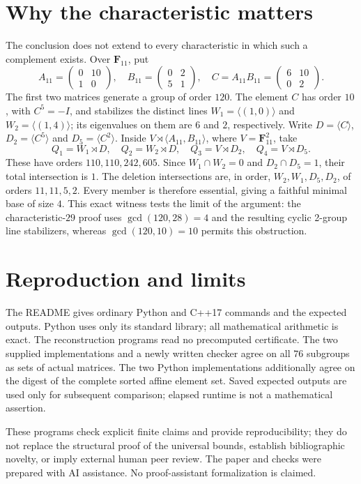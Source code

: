 \documentclass[11pt]{amsart}
\newcommand{\F}{\mathbf F}
\begin{document}
\section{Why the characteristic matters}

The conclusion does not extend to every characteristic in which such a
complement exists. Over $\F_{11}$, put
\[
 A_{11}=\begin{pmatrix}0&10\\1&0\end{pmatrix},\quad
 B_{11}=\begin{pmatrix}0&2\\5&1\end{pmatrix},\quad
 C=A_{11}B_{11}=\begin{pmatrix}6&10\\0&2\end{pmatrix}.
\]
The first two matrices generate a group of order $120$. The element $C$
has order $10$, with $C^5=-I$, and stabilizes the distinct lines
$W_1=\langle(1,0)\rangle$ and $W_2=\langle(1,4)\rangle$; its eigenvalues
on them are $6$ and $2$, respectively. Write $D=\langle C\rangle$,
$D_2=\langle C^5\rangle$ and $D_5=\langle C^2\rangle$.
Inside $V\rtimes\langle A_{11},B_{11}\rangle$, where $V=\F_{11}^2$, take
\[
 Q_1=W_1\rtimes D,\quad Q_2=W_2\rtimes D,\quad
 Q_3=V\rtimes D_2,\quad Q_4=V\rtimes D_5.
\]
These have orders $110,110,242,605$. Since $W_1\cap W_2=0$ and
$D_2\cap D_5=1$, their total intersection is $1$. The deletion intersections
are, in order, $W_2,W_1,D_5,D_2$, of orders $11,11,5,2$.
Every member is therefore essential, giving a faithful minimal base of
size $4$. This exact witness tests the limit of the argument: the
characteristic-$29$ proof uses $\gcd(120,28)=4$ and the resulting cyclic
2-group line stabilizers, whereas $\gcd(120,10)=10$ permits this obstruction.

\section{Reproduction and limits}

The README gives ordinary Python and C++17 commands and the expected outputs.
Python uses only its standard library; all mathematical arithmetic is exact.
The reconstruction programs read no precomputed certificate. The two supplied
implementations and a newly written checker agree on all $76$ subgroups as
sets of actual matrices. The two Python implementations additionally agree
on the digest of the complete sorted affine element set. Saved expected
outputs are used only for subsequent comparison; elapsed runtime is not a
mathematical assertion.

These programs check explicit finite claims and provide reproducibility;
they do not replace the structural proof of the universal bounds, establish
bibliographic novelty, or imply external human peer review. The paper and
checks were prepared with AI assistance. No proof-assistant formalization is
claimed.
\end{document}
